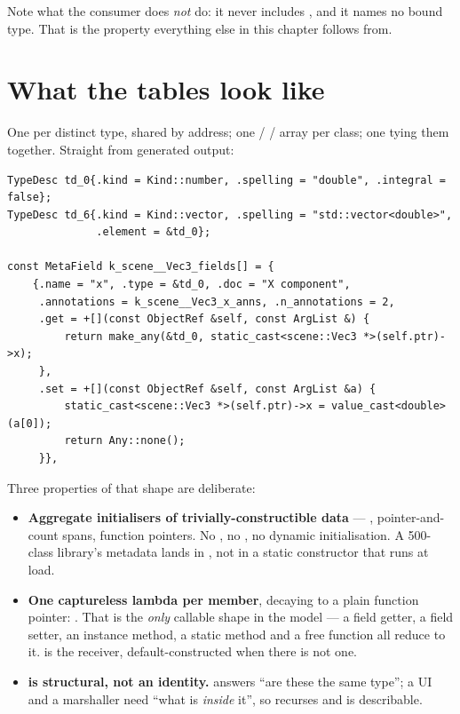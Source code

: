 Note what the consumer does \emph{not} do: it never includes , and
it names no bound type. That is the property everything else in this chapter
follows from.

\section{What the tables look like}

One  per distinct type, shared by address; one  /
 /  array per class; one  tying
them together. Straight from generated output:

\begin{lstlisting}[style=cpp]
TypeDesc td_0{.kind = Kind::number, .spelling = "double", .integral = false};
TypeDesc td_6{.kind = Kind::vector, .spelling = "std::vector<double>",
              .element = &td_0};

const MetaField k_scene__Vec3_fields[] = {
    {.name = "x", .type = &td_0, .doc = "X component",
     .annotations = k_scene__Vec3_x_anns, .n_annotations = 2,
     .get = +[](const ObjectRef &self, const ArgList &) {
         return make_any(&td_0, static_cast<scene::Vec3 *>(self.ptr)->x);
     },
     .set = +[](const ObjectRef &self, const ArgList &a) {
         static_cast<scene::Vec3 *>(self.ptr)->x = value_cast<double>(a[0]);
         return Any::none();
     }},
\end{lstlisting}

Three properties of that shape are deliberate:

\begin{itemize}
  \item \textbf{Aggregate initialisers of trivially-constructible data} ---
    , pointer-and-count spans, function pointers. No
    , no , no dynamic initialisation. A
    500-class library's metadata lands in , not in a static
    constructor that runs at load.
  \item \textbf{One captureless lambda per member}, decaying to a plain function
    pointer:
    .
    That is the \emph{only} callable shape in the model --- a field getter, a
    field setter, an instance method, a static method and a free function all
    reduce to it.  is the receiver, default-constructed when there
    is not one.
  \item \textbf{ is structural, not an identity.}
     answers ``are these the same type''; a UI and a
    marshaller need ``what is \emph{inside} it'', so  recurses and
     is describable.
\end{itemize}

